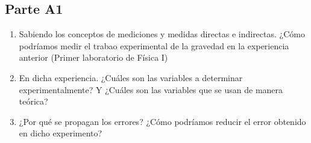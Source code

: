 \subsection{Parte A1}%
\label{sub:cues_parte_a1}

\begin{enumerate}
	\item Sabiendo los conceptos de mediciones y medidas directas e indirectas.
		¿Cómo podríamos medir el trabao experimental de la gravedad en la experiencia anterior
		(Primer laboratorio de Física I)
	\item En dicha experiencia. ¿Cuáles son las variables a determinar experimentalmente?
		Y ¿Cuáles son las variables que se usan de manera teórica?
	\item ¿Por qué se propagan los errores?
		¿Cómo podríamos reducir el error obtenido en dicho experimento?
\end{enumerate}
